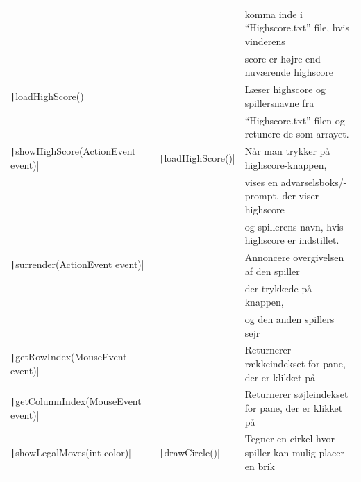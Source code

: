 \begin{table}[H]
\begin{tabular}{lll}
                                                                &                                    & komma inde i ``Highscore.txt'' file, hvis vinderens       \\
                                                                &                                    & score er højre end nuværende highscore                    \\
        \texttt|loadHighScore()|                      &                                    & Læser highscore og spillersnavne fra                      \\
                                                                &                                    & ``Highscore.txt'' filen og retunere de som arrayet.       \\
        \texttt|showHighScore(ActionEvent event)|     & \texttt|loadHighScore()| & Når man trykker på highscore-knappen,                     \\
                                                                &                                    & vises en advarselsboks/-prompt, der viser highscore       \\
                                                                &                                    & og spillerens navn, hvis highscore er indstillet.         \\
        \texttt|surrender(ActionEvent event)|         &                                    & Annoncere overgivelsen af den spiller                     \\
                                                                &                                    & der trykkede på knappen,                                  \\
                                                                &                                    & og den anden spillers sejr                                \\
        \texttt|getRowIndex(MouseEvent event)|        &                                    & Returnerer rækkeindekset for pane, der er klikket på      \\
        \texttt|getColumnIndex(MouseEvent event)|     &                                    & Returnerer søjleindekset for pane, der er klikket på      \\
        \texttt|showLegalMoves(int color)|            & \texttt|drawCircle()|    & Tegner en cirkel hvor spiller kan mulig placer en brik    \\

\end{tabular}
\end{table}
